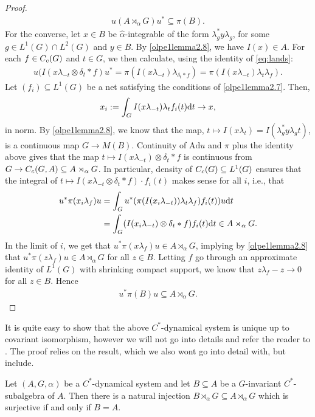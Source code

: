 \begin{proof}
\begin{align*}
		u (A \rtimes_\alpha G)u^* \subseteq \pi(B).
	\end{align*}
	For the converse, let $x \in B$ be $\hat \alpha$-integrable of the form $\lambda_g^* y \lambda_g$, for some $g \in L^1(G) \cap L^2(G)$ and $y \in B$. By \cref{olpe1lemma2.8}, we have $I(x) \in A$. For each $f \in C_c(G)$ and $t \in G$, we then calculate, using the identity of \cref{eq:lands}:
	\begin{align*}
		u(I(x\lambda_{-t} \otimes \delta_t \ast f) u^* = \pi(I(x\lambda_{-t})\lambda_{\delta_t \ast f}) = \pi(I(x \lambda_{-t}) \lambda_t \lambda_f).
	\end{align*}
	Let $(f_i) \subseteq L^1(G)$ be a net satisfying the conditions of \cref{olpe1lemma2.7}. Then, 
	\begin{align*}
		x_i := \int_G I(x \lambda_{-t}) \lambda_t f_i(t) \mathrm{d} t \to x,
	\end{align*}
	in norm. By \cref{olpe1lemma2.8}, we know that the map, $t \mapsto I(x\lambda_t)=I(\lambda_g^* y \lambda_g t)$, is a continuous map $G \to M(B)$. Continuity of $\mathrm{Ad} u$ and $\pi$ plus the identity above gives that the map $t \mapsto I(x \lambda_{-t}) \otimes \delta_t \ast f$ is continuous from $G \to C_c(G,A) \subseteq A \rtimes_\alpha G$. In particular, density of $C_c(G)\subseteq L^1(G)$ ensures that the integral of $t \mapsto I(x \lambda_{-t} \otimes \delta_t \ast f) \cdot f_i(t)$ makes sense for all $i$, i.e., that
	\begin{align*}
		u^* \pi(x_i \lambda_f)u &= \int_G u^* (\pi(I(x_i \lambda_{-t})) \lambda_t \lambda_f )f_i(t))u \mathrm{d} t \\
		&= \int_G (I(x_i \lambda_{-t}) \otimes \delta_t \ast f ) f_i(t) \mathrm{d} t \in A \rtimes_\alpha G.
	\end{align*}
	In the limit of $i$, we get that $u^* \pi(x \lambda_f) u \in A \rtimes_\alpha G$, implying by \cref{olpe1lemma2.8} that $u^* \pi(z \lambda_f) u \in A \rtimes_\alpha G$ for all $z \in B$. Letting $f$ go through an approximate identity of $L^1(G)$ with shrinking compact support, we know that $z\lambda_f - z \to 0$ for all $z \in B$. Hence
	\begin{align*}
		u^* \pi(B) u \subseteq A \rtimes_\alpha G.
	\end{align*}	
\end{proof}
It is quite easy to show that the above $C^*$-dynamical system is unique up to covariant isomorphism, however we will not go into details and refer the reader to \cite[Theorem 2.9]{olesenpedersen1}. The proof relies on the result, which we also wont go into detail with, but include.
\begin{lemma}%
	Let $(A, G, \alpha)$ be a $C^*$-dynamical system and let $B \subseteq A$ be a $G$-invariant $C^*$-subalgebra of $A$. Then there is a natural injection $B \rtimes_\alpha G \subseteq A \rtimes_\alpha G$ which is surjective if and only if $B = A$.
\end{lemma}

